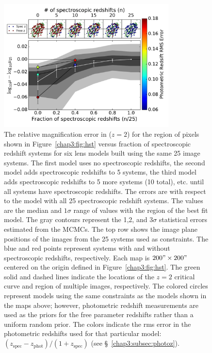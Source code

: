 \begin{figure}
\center
\includegraphics[width=0.8\textwidth]{Chap3/c3f10.pdf}
\caption[Relative magnification error of single model with increasing spec-z fraction]{The relative magnification error in ($z=2$) for the region of pixels shown in Figure~\ref{chap3:fig:hst} versus fraction of spectroscopic redshift systems for six lens models built using the same 25 image systems. The first model uses no spectroscopic redshifts, the second model adds spectroscopic redshifts to 5 systems, the third model adds spectroscopic redshifts to 5 more systems (10 total), etc. until all systems have spectroscopic redshifts. The errors are with respect to the model with all 25 spectroscopic redshift systems. The values are the median and $1\sigma$ range of values with the region of the best fit model. The gray contours represent the 1,2, and 3$\sigma$ statistical errors estimated from the MCMCs. The top row shows the image plane positions of the images from the 25 systems used as constraints. The blue and red points represent systems with and without spectroscopic redshifts, respectively. Each map is $200"\times200"$ centered on the origin defined in Figure~\ref{chap3:fig:hst}. The green solid and dashed lines indicate the locations of the $z=2$ critical curve and region of multiple images, respectively. The colored circles represent models using the same constraints as the models shown in the maps above; however, photometric redshift measurements are used as the priors for the free parameter redshifts rather than a uniform random prior. The colors indicate the rms error in the photometric redshifts used for that particular model: $(z_\mathrm{spec}-z_\mathrm{phot})/(1+z_\mathrm{spec})$ (see \S~\ref{chap3:subsec:photoz}).}
\label{chap3:fig:single_compare}
\end{figure}

